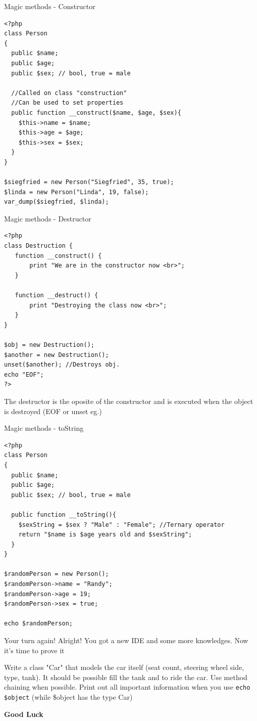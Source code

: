 \begin{frame}[fragile]{Magic methods - Constructor}
\begin{lstlisting}
<?php
class Person
{
  public $name;
  public $age;
  public $sex; // bool, true = male
  
  //Called on class "construction"
  //Can be used to set properties
  public function __construct($name, $age, $sex){
  	$this->name = $name;
  	$this->age = $age;
  	$this->sex = $sex;
  }
}

$siegfried = new Person("Siegfried", 35, true);
$linda = new Person("Linda", 19, false);
var_dump($siegfried, $linda);
\end{lstlisting}
\end{frame}

\begin{frame}[fragile]{Magic methods - Destructor}
\begin{lstlisting}
<?php
class Destruction {
   function __construct() {
       print "We are in the constructor now <br>";
   }

   function __destruct() {
       print "Destroying the class now <br>";
   }
}

$obj = new Destruction();
$another = new Destruction();
unset($another); //Destroys obj.
echo "EOF";
?>
\end{lstlisting}

The destructor is the oposite of the constructor and is executed when the object is destroyed (EOF or unset eg.)
\end{frame}

\begin{frame}[fragile]{Magic methods - toString}
\begin{lstlisting}
<?php
class Person
{
  public $name;
  public $age;
  public $sex; // bool, true = male
  
  public function __toString(){
    $sexString = $sex ? "Male" : "Female"; //Ternary operator
  	return "$name is $age years old and $sexString";
  }
}

$randomPerson = new Person(); 
$randomPerson->name = "Randy";
$randomPerson->age = 19;
$randomPerson->sex = true;

echo $randomPerson;
\end{lstlisting}
\end{frame}


\begin{frame}[fragile]{Your turn again!}
Alright! You got a new IDE and some more knowledges. Now it's time to prove it\pause

Write a class "Car" that models the car itself (seat count, steering wheel side, type, tank). It should be possible fill the tank and to ride the car. Use method chaining when possible. Print out all important information when you use \texttt{echo \$object} (while \$object has the type Car)

\textbf{Good Luck}
\end{frame}



